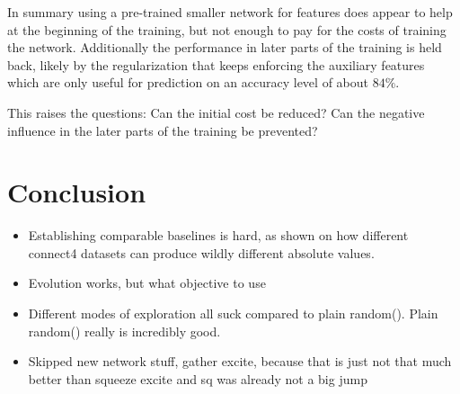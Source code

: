 \documentclass[12pt,onecolumn,oneside,titlepage]{article}
\begin{document}
In summary using a pre-trained smaller network for features does appear to help at the beginning of the training, but not enough to pay for the costs of training the network. Additionally the performance in later parts of the training is held back, likely by the
regularization that keeps enforcing the auxiliary features which are only useful for prediction on an accuracy level of about $84\%$.

This raises the questions: Can the initial cost be reduced? Can the negative influence in the later parts of the training be prevented?




\section{Conclusion}

\begin{itemize}
 \item Establishing comparable baselines is hard, as shown on how different connect4 datasets can produce wildly different absolute values.
 \item Evolution works, but what objective to use
 \item Different modes of exploration all suck compared to plain random(). Plain random() really is incredibly good.
 \item Skipped new network stuff, gather excite, because that is just not that much better than squeeze excite and sq was already not a big jump
\end{itemize}



\pagebreak




\end{document}

